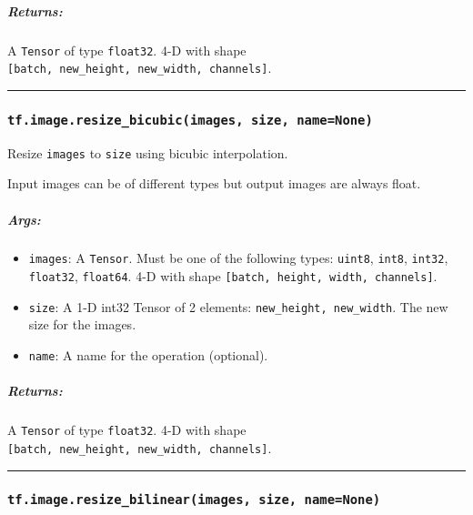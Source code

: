 \subparagraph{Returns: }\label{returns-5}

A \texttt{Tensor} of type \texttt{float32}. 4-D with shape
\texttt{{[}batch,\ new\_height,\ new\_width,\ channels{]}}.

\begin{center}\rule{0.5\linewidth}{\linethickness}\end{center}

\subsubsection{\texorpdfstring{\texttt{tf.image.resize\_bicubic(images,\ size,\ name=None)}
}{tf.image.resize\_bicubic(images, size, name=None) }}\label{tf.image.resizeux5fbicubicimages-size-namenone}

Resize \texttt{images} to \texttt{size} using bicubic interpolation.

Input images can be of different types but output images are always
float.

\subparagraph{Args: }\label{args-6}

\begin{itemize}
\tightlist
\item
  \texttt{images}: A \texttt{Tensor}. Must be one of the following
  types: \texttt{uint8}, \texttt{int8}, \texttt{int32},
  \texttt{float32}, \texttt{float64}. 4-D with shape
  \texttt{{[}batch,\ height,\ width,\ channels{]}}.
\item
  \texttt{size}: A 1-D int32 Tensor of 2 elements:
  \texttt{new\_height,\ new\_width}. The new size for the images.
\item
  \texttt{name}: A name for the operation (optional).
\end{itemize}

\subparagraph{Returns: }\label{returns-6}

A \texttt{Tensor} of type \texttt{float32}. 4-D with shape
\texttt{{[}batch,\ new\_height,\ new\_width,\ channels{]}}.

\begin{center}\rule{0.5\linewidth}{\linethickness}\end{center}

\subsubsection{\texorpdfstring{\texttt{tf.image.resize\_bilinear(images,\ size,\ name=None)}
}{tf.image.resize\_bilinear(images, size, name=None) }}\label{tf.image.resizeux5fbilinearimages-size-namenone}

